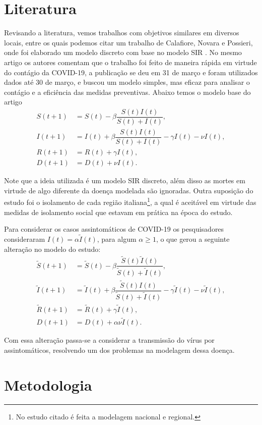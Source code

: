 \documentclass{article}
\begin{document}
\section{Literatura}

Revisando a literatura, vemos trabalhos com objetivos similares em diversos locais, entre os quais podemos citar um trabalho de Calafiore, Novara e Possieri, onde foi elaborado um modelo discreto com base no modelo SIR \cite{calafiore2020modified}. No mesmo artigo os autores comentam que o trabalho foi feito de maneira rápida em virtude do contágio da COVID-19, a publicação se deu em 31 de março e foram utilizados dados até 30 de março, e buscou um modelo simples, mas eficaz para analisar o contágio e a eficiência das medidas preventivas. Abaixo temos o modelo base do artigo
\begin{equation*}
    \begin{split}
        S(t + 1) & = S(t) - \beta \dfrac{S(t) I(t)}{S(t) + I(t)}, \\
        I(t + 1) & = I(t) + \beta \dfrac{S(t) I(t)}{S(t) + I(t)} - \gamma I(t) - \nu I(t), \\
        R(t + 1) & = R(t) + \gamma I(t), \\
        D(t + 1) & = D(t) + \nu I(t).
    \end{split}
\end{equation*}

Note que a ideia utilizada é um modelo SIR discreto, além disso as mortes em virtude de algo diferente da doença modelada são ignoradas. Outra suposição do estudo foi o isolamento de cada região italiana\footnote{No estudo citado é feita a modelagem nacional e regional.}, a qual é aceitável em virtude das medidas de isolamento social que estavam em prática na época do estudo.

Para considerar os casos assintomáticos de COVID-19 os pesquisadores consideraram $I(t) = \alpha\tilde{I}(t)$, para algum $\alpha \geq 1$, o que gerou a seguinte alteração no modelo do estudo:
\begin{equation*}
    \begin{split}
        \tilde{S}(t + 1) & = \tilde{S}(t) - \beta \dfrac{\tilde{S}(t) \tilde{I}(t)}{\tilde{S}(t) + \tilde{I}(t)}, \\
        \tilde{I}(t + 1) & = \tilde{I}(t) + \beta \dfrac{\tilde{S}(t) I(t)}{\tilde{S}(t) + \tilde{I}(t)} - \gamma \tilde{I}(t) - \nu \tilde{I}(t), \\
        \tilde{R}(t + 1) & = \tilde{R}(t) + \gamma \tilde{I}(t), \\
        D(t + 1) & = D(t) + \alpha \nu \tilde{I}(t).
    \end{split}
\end{equation*}

Com essa alteração passa-se a considerar a transmissão do vírus por assintomáticos, resolvendo um dos problemas na modelagem dessa doença.



\section{Metodologia}




\printbibliography
\end{document}
